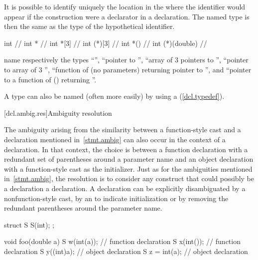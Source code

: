 It is possible to identify uniquely the location in the
where the identifier would appear if the construction were a declarator
in a declaration.
The named type is then the same as the type of the
hypothetical identifier.
\enterexample

%
%
\begin{codeblock}
int                 // 
int *               // 
int *[3]            // 
int (*)[3]          // 
int *()             // 
int (*)(double)     // 
\end{codeblock}

name respectively the types
``'',
``pointer to
'',
``array of 3 pointers to
'',
``pointer to array of 3
'',
``function of (no parameters) returning pointer to
'',
and ``pointer to a function of
()
returning
''.
\exitexample

\pnum
A type can also be named (often more easily) by using a
(\ref{dcl.typedef}).

[dcl.ambig.res]{Ambiguity resolution}%
%

\pnum
The ambiguity arising from the similarity between a function-style cast and
a declaration mentioned in~\ref{stmt.ambig} can also occur in the context of a declaration.
In that context, the choice is between a function declaration with
a redundant set of parentheses around a parameter name and an object declaration
with a function-style cast as the initializer.
Just as for the ambiguities mentioned in~\ref{stmt.ambig},
the resolution is to consider any construct that could possibly
be a declaration a declaration.
\enternote
A declaration can be explicitly disambiguated by a nonfunction-style
cast, by an
\tcode{=}
to indicate initialization or
by removing the redundant parentheses around the parameter name.
\exitnote
\enterexample

\begin{codeblock}
struct S {
  S(int);
};

void foo(double a) {
  S w(int(a));      // function declaration
  S x(int());       // function declaration
  S y((int)a);      // object declaration
  S z = int(a);     // object declaration
}
\end{codeblock}
\exitexample

